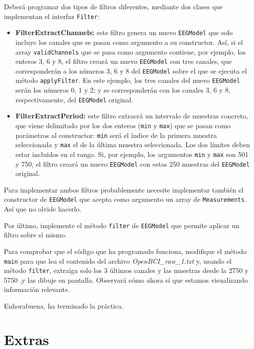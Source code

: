 \documentclass[10pt,a4paper,spanish]{article}
\newcommand{\code}[1]{\texttt{#1}}
\begin{document}
Deberá programar dos tipos de filtros diferentes, mediante dos clases que implementan
el interfaz \code{Filter}:

\begin{itemize}
    \item \textbf{FilterExtractChannels:} este filtro genera un nuevo \code{EEGModel} que solo incluye los canales que se pasan como argumento a su constructor. Así, si el array \code{validChannels} que se pasa como argumento contiene, por ejemplo, los enteros 3, 6 y 8, el filtro creará un nuevo \code{EEGModel} con tres canales, que corresponderán a los números 3, 6 y 8 del \code{EEGModel} sobre el que se ejecuta el método \code{applyFilter}. En este ejemplo, los tres canales del nuevo \code{EEGModel} serán los números 0, 1 y 2; y se corresponderán con los canales 3, 6 y 8, respectivamente, del \code{EEGModel} original.
    \item \textbf{FilterExtractPeriod:} este filtro extraerá un intervalo de muestras concreto, que viene delimitado por los dos enteros (\code{min} y \code{max}) que se pasan como parámetros al constructor: \code{min} será el índice de la primera muestra seleccionada y \code{max} el de la última muestra seleccionada. Los dos límites deben estar incluidos en el rango. Si, por ejemplo, los argumentos \code{min} y \code{max} son 501 y 750, el filtro creará un nuevo \code{EEGModel} con estas 250 muestras del \code{EEGModel} original.
\end{itemize}

Para implementar ambos filtros probablemente necesite implementar también el constructor de \code{EEGModel} que acepta como argumento un array de \code{Measurements}. Así que no olvide hacerlo.

Por último, implemente el método \code{filter} de \code{EEGModel} que permite aplicar un filtro sobre sí mismo.

Para comprobar que el código que ha programado funciona, modifique el método \code{main} para que lea el contenido del archivo \textit{OpenBCI\_raw\_1.txt} y, usando el método \code{filter}, extraiga solo los 3 últimos canales y las muestras desde la 2750 y 5750 ,y las dibuje en pantalla. Observará cómo ahora sí que estamos visualizando información relevante.

Enhorabuena, ha terminado la práctica.

\section{Extras}
\end{document}
